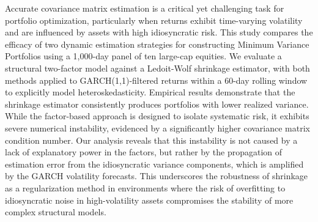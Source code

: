 \documentclass[]{article}
\begin{document}
Accurate covariance matrix estimation is a critical yet challenging task for portfolio optimization, particularly when returns exhibit time-varying volatility and are influenced by assets with high idiosyncratic risk. This study compares the efficacy of two dynamic estimation strategies for constructing Minimum Variance Portfolios using a 1,000-day panel of ten large-cap equities. We evaluate a structural two-factor model against a Ledoit-Wolf shrinkage estimator, with both methods applied to GARCH(1,1)-filtered returns within a 60-day rolling window to explicitly model heteroskedasticity. Empirical results demonstrate that the shrinkage estimator consistently produces portfolios with lower realized variance. While the factor-based approach is designed to isolate systematic risk, it exhibits severe numerical instability, evidenced by a significantly higher covariance matrix condition number. Our analysis reveals that this instability is not caused by a lack of explanatory power in the factors, but rather by the propagation of estimation error from the idiosyncratic variance components, which is amplified by the GARCH volatility forecasts. This underscores the robustness of shrinkage as a regularization method in environments where the risk of overfitting to idiosyncratic noise in high-volatility assets compromises the stability of more complex structural models.
\end{document}
